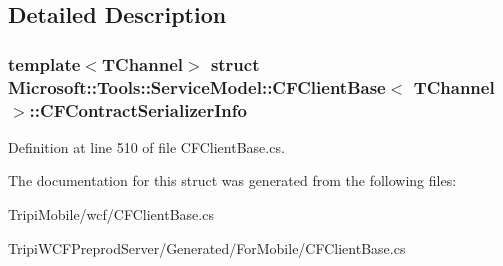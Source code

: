 \subsection{Detailed Description}
\subsubsection*{template$<$TChannel$>$ struct Microsoft::Tools::ServiceModel::CFClientBase$<$ TChannel $>$::CFContractSerializerInfo}



Definition at line 510 of file CFClientBase.cs.

The documentation for this struct was generated from the following files:\begin{DoxyCompactItemize}
\item 
TripiMobile/wcf/CFClientBase.cs\item 
TripiWCFPreprodServer/Generated/ForMobile/CFClientBase.cs\end{DoxyCompactItemize}
